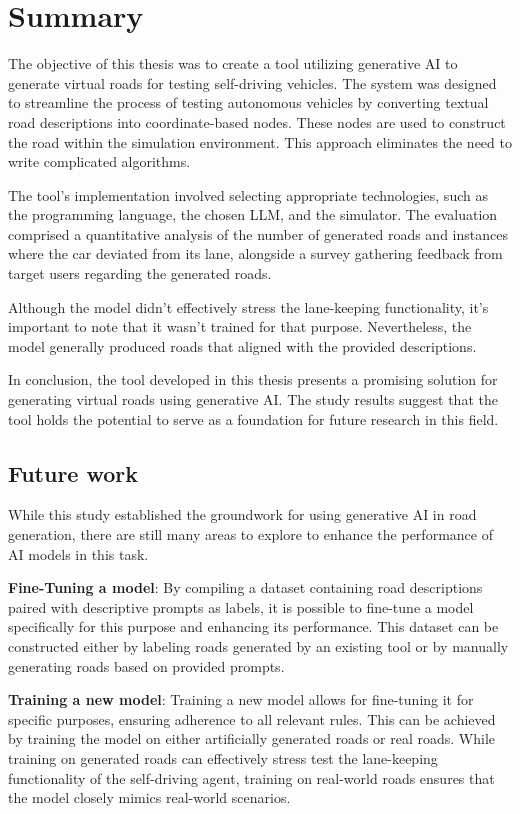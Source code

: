 \chapter{Summary}

The objective of this thesis was to create a tool utilizing generative AI to generate virtual roads for testing self-driving vehicles. The system was designed to streamline the process of testing autonomous vehicles by converting textual road descriptions into coordinate-based nodes. These nodes are used to construct the road within the simulation environment. This approach eliminates the need to write complicated algorithms.

The tool's implementation involved selecting appropriate technologies, such as the programming language, the chosen LLM, and the simulator. The evaluation comprised a quantitative analysis of the number of generated roads and instances where the car deviated from its lane, alongside a survey gathering feedback from target users regarding the generated roads.

Although the model didn't effectively stress the lane-keeping functionality, it's important to note that it wasn't trained for that purpose. Nevertheless, the model generally produced roads that aligned with the provided descriptions.

In conclusion, the tool developed in this thesis presents a promising solution for generating virtual roads using generative AI. The study results suggest that the tool holds the potential to serve as a foundation for future research in this field.


\section{Future work}

While this study established the groundwork for using generative AI in road generation, there are still many areas to explore to enhance the performance of AI models in this task.

\textbf{Fine-Tuning a model}: By compiling a dataset containing road descriptions paired with descriptive prompts as labels, it is possible to fine-tune a model specifically for this purpose and enhancing its performance. This dataset can be constructed either by labeling roads generated by an existing tool or by manually generating roads based on provided prompts.

\textbf{Training a new model}: Training a new model allows for fine-tuning it for specific purposes, ensuring adherence to all relevant rules. This can be achieved by training the model on either artificially generated roads or real roads. While training on generated roads can effectively stress test the lane-keeping functionality of the self-driving agent, training on real-world roads ensures that the model closely mimics real-world scenarios.


